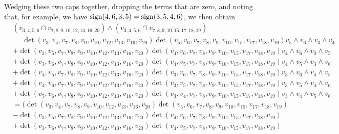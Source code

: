 \begin{example}
Wedging these two caps together, dropping the terms that are zero, and noting that, for example, we have ${\rm sign}(4,6,3,5)={\rm sign}(3,5,4,6)$, we then obtain
{\tiny 
\begin{align*}
    &(v_{{3},{4},{5},{6}} \cap v_{7, 8, 9, 10, 12,13,16,{20}}) \wedge (v_{3,4,5,6} \cap v_{7,8,9,10, 15, 17, 18, 19})   \\
     &=\det\left(v_{3},v_{4}, v_{7}, v_{8}, v_{9}, v_{10}, v_{12}, v_{13}, v_{16}, v_{20}\right)  \det\left(v_{5},v_{6},v_7,v_8,v_9,v_{10},v_{15}, v_{17}, v_{18}, v_{19}\right) v_{5} \wedge v_{6} \wedge v_{3} \wedge v_{4}\nonumber \\
     &+ \det\left(v_{3},v_{5},v_{7}, v_{8}, v_{9}, v_{10}, v_{12}, v_{13}, v_{16}, v_{20}\right) \det\left(v_{4},v_{6},v_7,v_8,v_9,v_{10},v_{15}, v_{17}, v_{18}, v_{19}\right) v_{4} \wedge v_{6} \wedge v_{3} \wedge v_{5} \nonumber \\
     &+\det\left(v_{3},v_{6},v_{7}, v_{8}, v_{9}, v_{10}, v_{12}, v_{13}, v_{16}, v_{20}\right) \det\left(v_{4},v_{5},v_7,v_8,v_9,v_{10},v_{15}, v_{17}, v_{18}, v_{19}\right) v_{4} \wedge v_{5} \wedge v_{3} \wedge v_{6} \nonumber \\
     &+ \det\left(v_{4},v_{5},v_{7}, v_{8}, v_{9}, v_{10}, v_{12}, v_{13}, v_{16}, v_{20}\right) \det\left(v_{3},v_{6},v_7,v_8,v_9,v_{10},v_{15}, v_{17}, v_{18}, v_{19}\right) v_{3} \wedge v_{6} \wedge v_{4} \wedge v_{5} \nonumber \\
     &+ \det\left(v_{4},v_{6},v_{7}, v_{8}, v_{9}, v_{10}, v_{12}, v_{13}, v_{16}, v_{20}\right) \det\left(v_{3},v_{5},v_7,v_8,v_9,v_{10},v_{15}, v_{17}, v_{18}, v_{19}\right) v_{3} \wedge v_{5}\wedge v_{4} \wedge v_{6} \nonumber \\
     &+\det\left(v_{5},v_{6},v_{7}, v_{8}, v_{9}, v_{10}, v_{12}, v_{13}, v_{16}, v_{20}\right) \det\left(v_{3},v_{4},v_7,v_8,v_9,v_{10},v_{15}, v_{17}, v_{18}, v_{19}\right) v_{3} \wedge v_{4} \wedge v_{5} \wedge v_{6} \nonumber \\
     &= \Bigg( \det\left(v_{3},v_{4}, v_{7}, v_{8}, v_{9}, v_{10}, v_{12}, v_{13}, v_{16}, v_{20}\right)  \det\left(v_{5},v_{6},v_7,v_8,v_9,v_{10},v_{15}, v_{17}, v_{18}, v_{19}\right) \nonumber \\
     &- \det\left(v_{3},v_{5},v_{7}, v_{8}, v_{9}, v_{10}, v_{12}, v_{13}, v_{16}, v_{20}\right) \det\left(v_{4},v_{6},v_7,v_8,v_9,v_{10},v_{15}, v_{17}, v_{18}, v_{19}\right) \nonumber \\
     &+ \det\left(v_{3},v_{6},v_{7}, v_{8}, v_{9}, v_{10}, v_{12}, v_{13}, v_{16}, v_{20}\right) \det\left(v_{4},v_{5},v_7,v_8,v_9,v_{10},v_{15}, v_{17}, v_{18}, v_{19}\right) \nonumber \\

\end{align*}}
\end{example}
